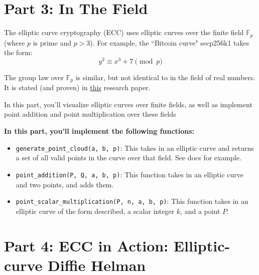 \documentclass{article}
\begin{document}
\section*{Part 3: In The Field}
The elliptic curve cryptography (ECC) uses elliptic curves over the finite field $\mathbb{F}_{p}$ (where $p$ is prime and $p > 3$). For example, the ``Bitcoin curve" secp256k1 takes the form:
$$y^{2} \equiv x^{3} + 7 \pmod{p}$$


The group law over $\mathbb{F}_{p}$ is similar, but not identical to in the field of real numbers. It is stated (and proven) in \href{https://arxiv.org/pdf/1710.00214.pdf}{this} research paper.


\begin{tcolorbox}
    In this part, you'll visualize elliptic curves over finite fields, as well as implement point addition and point multiplication over these fields

    
    \textbf{In this part, you'll implement the following functions:}
    \begin{itemize}
        \item \lstinline{generate_point_cloud(a, b, p)}: This takes in an elliptic curve and returns a set of all valid points in the curve over that field. See docs for example.
        \item \lstinline{point_addition(P, Q, a, b, p)}: This function takes in an elliptic curve and two points, and adds them.
        \item \lstinline{point_scalar_multiplication(P, n, a, b, p)}: This function takes in an elliptic curve of the form described, a scalar integer $k$, and a point $P$.
    \end{itemize}
    
\end{tcolorbox}

\section*{Part 4: ECC in Action: Elliptic-curve Diffie Helman}


\end{document}
